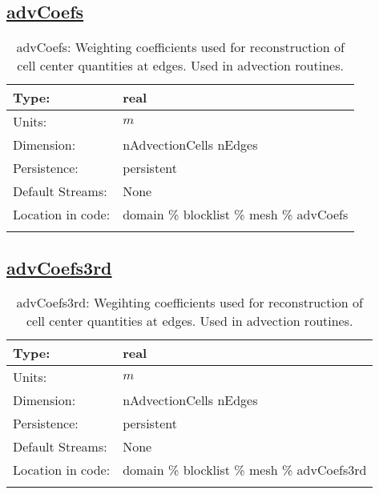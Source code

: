 \subsection[advCoefs]{\hyperref[sec:var_tab_mesh]{advCoefs}}
\label{subsec:var_sec_mesh_advCoefs}
\begin{center}
\begin{longtable}{| p{2.0in} | p{4.0in} |}
        \hline 
        Type: & real \\
        \hline 
        Units: & $m$ \\
        \hline 
        Dimension: & nAdvectionCells nEdges \\
        \hline 
        Persistence: & persistent \\
        \hline 
		 Default Streams: & None \\
        \hline 
		 Location in code: & domain \% blocklist \% mesh \% advCoefs \\
		 \hline 
    \caption{advCoefs: Weighting coefficients used for reconstruction of cell center quantities at edges. Used in advection routines.}
\end{longtable}
\end{center}
\subsection[advCoefs3rd]{\hyperref[sec:var_tab_mesh]{advCoefs3rd}}
\label{subsec:var_sec_mesh_advCoefs3rd}
\begin{center}
\begin{longtable}{| p{2.0in} | p{4.0in} |}
        \hline 
        Type: & real \\
        \hline 
        Units: & $m$ \\
        \hline 
        Dimension: & nAdvectionCells nEdges \\
        \hline 
        Persistence: & persistent \\
        \hline 
		 Default Streams: & None \\
        \hline 
		 Location in code: & domain \% blocklist \% mesh \% advCoefs3rd \\
		 \hline 
    \caption{advCoefs3rd: Wegihting coefficients used for reconstruction of cell center quantities at edges. Used in advection routines.}
\end{longtable}
\end{center}
